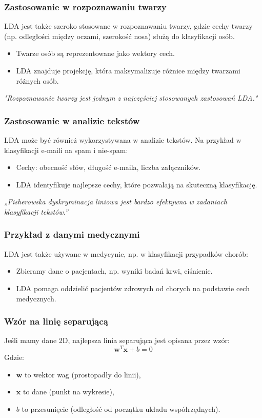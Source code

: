 \documentclass{beamer}
\begin{document}
\begin{frame}
    \frametitle{Zastosowanie w rozpoznawaniu twarzy}
    LDA jest także szeroko stosowane w rozpoznawaniu twarzy, gdzie cechy twarzy (np. odległości między oczami, szerokość nosa) służą do klasyfikacji osób.
    \begin{itemize}
        \item Twarze osób są reprezentowane jako wektory cech.
        \item LDA znajduje projekcję, która maksymalizuje różnice między twarzami różnych osób.
    \end{itemize}
    \textit{"Rozpoznawanie twarzy jest jednym z najczęściej stosowanych zastosowań LDA."}
\end{frame}

\begin{frame}
    \frametitle{Zastosowanie w analizie tekstów}
    LDA może być również wykorzystywana w analizie tekstów. Na przykład w klasyfikacji e-maili na spam i nie-spam:
    \begin{itemize}
        \item Cechy: obecność słów, długość e-maila, liczba załączników.
        \item LDA identyfikuje najlepsze cechy, które pozwalają na skuteczną klasyfikację.
    \end{itemize}
    \textit{„Fisherowska dyskryminacja liniowa jest bardzo efektywna w zadaniach klasyfikacji tekstów.”}
\end{frame}

\begin{frame}
    \frametitle{Przykład z danymi medycznymi}
    LDA jest także używane w medycynie, np. w klasyfikacji przypadków chorób:
    \begin{itemize}
        \item Zbieramy dane o pacjentach, np. wyniki badań krwi, ciśnienie.
        \item LDA pomaga oddzielić pacjentów zdrowych od chorych na podstawie cech medycznych.
    \end{itemize}
\end{frame}

\begin{frame}
    \frametitle{Wzór na linię separującą}
    Jeśli mamy dane 2D, najlepsza linia separująca jest opisana przez wzór:
    \[
    \mathbf{w}^T \mathbf{x} + b = 0
    \]
    Gdzie:
    \begin{itemize}
        \item \( \mathbf{w} \) to wektor wag (prostopadły do linii),
        \item \( \mathbf{x} \) to dane (punkt na wykresie),
        \item \( b \) to przesunięcie (odległość od początku układu współrzędnych).
    \end{itemize}
\end{frame}
\end{document}
